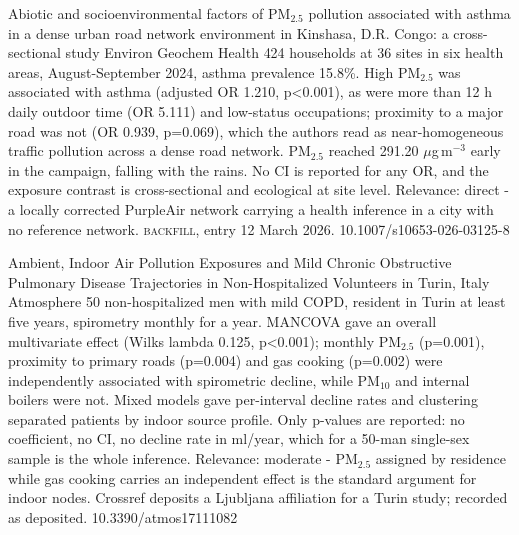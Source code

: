\documentclass[10pt]{article}
\begin{document}
{Abiotic and socioenvironmental factors of PM$_{2.5}$ pollution associated with asthma in a dense urban road network environment in Kinshasa, D.R. Congo: a cross-sectional study}
{Environ Geochem Health}
{424 households at 36 sites in six health areas, August-September 2024, asthma prevalence 15.8\%. High PM$_{2.5}$ was associated with asthma (adjusted OR 1.210, p<0.001), as were more than 12 h daily outdoor time (OR 5.111) and low-status occupations; proximity to a major road was not (OR 0.939, p=0.069), which the authors read as near-homogeneous traffic pollution across a dense road network. PM$_{2.5}$ reached 291.20 $\mu$g\,m$^{-3}$ early in the campaign, falling with the rains. No CI is reported for any OR, and the exposure contrast is cross-sectional and ecological at site level. Relevance: direct - a locally corrected PurpleAir network carrying a health inference in a city with no reference network. \textsc{backfill}, entry 12 March 2026.}
{10.1007/s10653-026-03125-8}

{Ambient, Indoor Air Pollution Exposures and Mild Chronic Obstructive Pulmonary Disease Trajectories in Non-Hospitalized Volunteers in Turin, Italy}
{Atmosphere}
{50 non-hospitalized men with mild COPD, resident in Turin at least five years, spirometry monthly for a year. MANCOVA gave an overall multivariate effect (Wilks lambda 0.125, p<0.001); monthly PM$_{2.5}$ (p=0.001), proximity to primary roads (p=0.004) and gas cooking (p=0.002) were independently associated with spirometric decline, while PM$_{10}$ and internal boilers were not. Mixed models gave per-interval decline rates and clustering separated patients by indoor source profile. Only p-values are reported: no coefficient, no CI, no decline rate in ml/year, which for a 50-man single-sex sample is the whole inference. Relevance: moderate - PM$_{2.5}$ assigned by residence while gas cooking carries an independent effect is the standard argument for indoor nodes. Crossref deposits a Ljubljana affiliation for a Turin study; recorded as deposited.}
{10.3390/atmos17111082}

\par{}\baselineskip{}\baselineskip
{}
\end{document}
